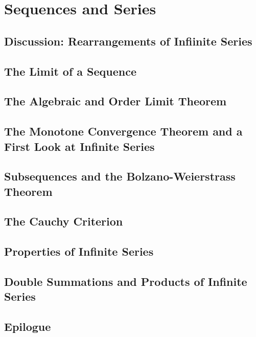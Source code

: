 \documentclass[class=understanding-analysis,crop=false]{standalone}
\begin{document}
\chapter{Sequences and Series}

\section{Discussion: Rearrangements of Infiinite Series}

\section{The Limit of a Sequence}

\section{The Algebraic and Order Limit Theorem}

\section{The Monotone Convergence Theorem and a First Look at Infinite Series}

\section{Subsequences and the Bolzano-Weierstrass Theorem}

\section{The Cauchy Criterion}

\section{Properties of Infinite Series}

\section{Double Summations and Products of Infinite Series}

\section{Epilogue}
\end{document}
